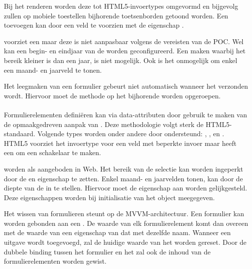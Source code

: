 Bij het renderen worden deze tot HTML5-invoertypes omgevormd en bijgevolg zullen op mobiele toestellen bijhorende toetsenborden getoond worden.
Een  toevoegen kan door een veld te voorzien met de eigenschap .

\st{} voorziet een  maar deze is niet aanpasbaar volgens de vereisten van de POC.
Wel kan een begin- en eindjaar van de  worden geconfigureerd.
Een  maken waarbij het bereik kleiner is dan een jaar, is niet mogelijk.
Ook is het onmogelijk om enkel een maand- en jaarveld te tonen.

Het leegmaken van een formulier gebeurt niet automatisch wanneer het verzonden wordt.
Hiervoor moet de  methode op het bijhorende  worden opgeroepen.

\paragraph{\kendo}
 Formulierelementen definiëren kan via data-attributen door gebruik te maken van de opmaakgedreven aanpak van \kendo.
 Deze methodologie volgt sterk de HTML5-standaard.
 Volgende types worden onder andere door \kendo{} ondersteund:  , ,  en .
 HTML5 voorziet het invoertype  voor een veld met beperkte invoer maar \kendo{} heeft een  om een schakelaar te maken.

  worden als  aangeboden in \kendo Web.
 Het bereik van de selectie kan worden ingeperkt door de  en  eigenschap te zetten.
 Enkel maand- en jaarvelden tonen, kan door de diepte van de  in te stellen.
 Hiervoor moet de eigenschap  aan  worden gelijkgesteld.
 Deze eigenschappen worden bij initialisatie van het object meegegeven.
 
 
 Het wissen van formulieren steunt op de MVVM-architectuur.
 Een formulier kan worden gebonden aan een .
 De waarde van elk formulierelement komt dan overeen met de waarde van een eigenschap van dat  met dezelfde naam.
 Wanneer een uitgave wordt toegevoegd, zal de huidige waarde van het  worden gereset.
 Door de dubbele binding tussen het formulier en het  zal ook de inhoud van de formulierelementen worden gewist.
 
